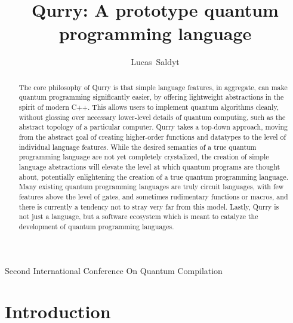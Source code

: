 \documentclass[journal]{article}
\begin{document}
\title{Qurry: A prototype quantum programming language}

\author{Lucas~Saldyt}%

%
{Second International Conference On Quantum Compilation}

\maketitle

\begin{abstract}
    The core philosophy of Qurry is that simple language features, in aggregate, can make quantum programming significantly easier, by offering lightweight abstractions in the spirit of modern C++.
    This allows users to implement quantum algorithms cleanly, without glossing over necessary lower-level details of quantum computing, such as the abstract topology of a particular computer.
    Qurry takes a top-down approach, moving from the abstract goal of creating higher-order functions and datatypes to the level of individual language features.
    While the desired semantics of a true quantum programming language are not yet completely crystalized, the creation of simple language abstractions will elevate the level at which quantum programs are thought about, potentially enlightening the creation of a true quantum programming language.
    Many existing quantum programming languages are truly circuit languages, with few features above the level of gates, and sometimes rudimentary functions or macros, and there is currently a tendency not to stray very far from this model.
    Lastly, Qurry is not just a language, but a software ecosystem which is meant to catalyze the development of quantum programming languages.
\end{abstract}



\section{Introduction}
\end{document}
